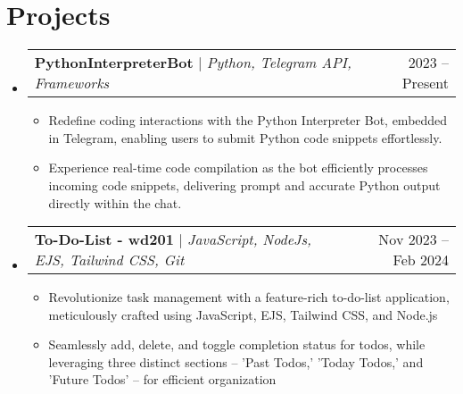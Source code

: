 \documentclass[letterpaper,11pt]{article}
\makeatletter
\newcommand{\resumeItem}[1]{
  \item\small{
    {#1 \vspace{-2pt}}
  }
}
\newcommand{\resumeSubheading}[4]{
  \vspace{-2pt}\item
    \begin{tabular*}{0.97\textwidth}[t]{l@{\extracolsep{\fill}}r}
      \textbf{#1} & #2 \\
      \textit{\small#3} & \textit{\small #4} \\
    \end{tabular*}\vspace{-7pt}
}
\newcommand{\resumeProjectHeading}[2]{
    \item
    \begin{tabular*}{0.97\textwidth}{l@{\extracolsep{\fill}}r}
      \small#1 & #2 \\
    \end{tabular*}\vspace{-7pt}
}
\newcommand{\resumeSubHeadingListStart}{\begin{itemize}[leftmargin=0.15in, label={}]}
\newcommand{\resumeSubHeadingListEnd}{\end{itemize}}
\newcommand{\resumeItemListStart}{\begin{itemize}}
\newcommand{\resumeItemListEnd}{\end{itemize}\vspace{-5pt}}
\makeatother
\begin{document}




\section{Projects}
    \resumeSubHeadingListStart
      \resumeProjectHeading
          {\textbf{PythonInterpreterBot} $|$ \emph{Python, Telegram API, Frameworks}}{2023 -- Present}
        \resumeItemListStart
        \resumeItem{Redefine coding interactions with the Python Interpreter Bot, embedded in Telegram, enabling users to submit Python code snippets effortlessly.}
        \resumeItem{Experience real-time code compilation as the bot efficiently processes incoming code snippets, delivering prompt and accurate Python output directly within the chat.}
    \resumeItemListEnd
      \resumeProjectHeading
          {\textbf{To-Do-List - wd201} $|$ \emph{JavaScript, NodeJs, EJS, Tailwind CSS, Git}}{Nov 2023 -- Feb 2024}
          \resumeItemListStart
        \resumeItem{Revolutionize task management with a feature-rich to-do-list application, meticulously crafted using JavaScript, EJS, Tailwind CSS, and Node.js}
        \resumeItem{Seamlessly add, delete, and toggle completion status for todos, while leveraging three distinct sections – 'Past Todos,' 'Today Todos,' and 'Future Todos' – for efficient organization} 
          \resumeItemListEnd
    \resumeSubHeadingListEnd
\end{document}
